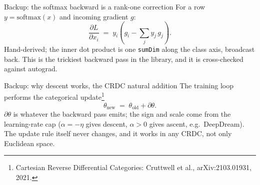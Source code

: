 \documentclass[aspectratio=169,11pt]{beamer}
\begin{document}
\begin{frame}{Backup: the softmax backward is a rank-one correction}
  For a row $y=\mathrm{softmax}(x)$ and incoming gradient $g$:
  \[ \frac{\partial L}{\partial x_i} \;=\; y_i\!\left(g_i - \sum_j y_j\,g_j\right). \]
  Hand-derived; the inner dot product is one \texttt{sumDim} along the class axis, broadcast back.
  This is the trickiest backward pass in the library, and it is cross-checked against autograd.
\end{frame}

\begin{frame}{Backup: why descent works, the CRDC natural addition}
  The training loop performs the categorical update\footnote[frame]{Cartesian Reverse Differential Categories: Cruttwell et al., arXiv:2103.01931, 2021.}
  \[ \theta_{\text{new}} \;=\; \theta_{\text{old}} + \partial\theta. \]
  $\partial\theta$ is whatever the backward pass emits; the sign and scale come from the learning-rate
  cap ($\alpha=-\eta$ gives descent, $\alpha>0$ gives ascent, e.g.\ DeepDream). The update rule itself
  never changes, and it works in any CRDC, not only Euclidean space.
\end{frame}
\end{document}
